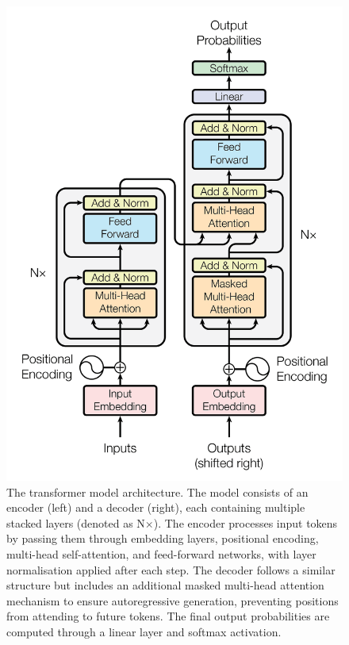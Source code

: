 \begin{figure}[htbp]
  \centering
  \includegraphics[scale=0.2]{../sections/transformer-architecture/attachments/transformer.png}
  \caption{The transformer model architecture. The model consists of an encoder (left) and a decoder (right), each containing multiple stacked layers (denoted as N$\times$). The encoder processes input tokens by passing them through embedding layers, positional encoding, multi-head self-attention, and feed-forward networks, with layer normalisation applied after each step. The decoder follows a similar structure but includes an additional masked multi-head attention mechanism to ensure autoregressive generation, preventing positions from attending to future tokens. The final output probabilities are computed through a linear layer and softmax activation.}\label{fig:transformer}
\end{figure}

